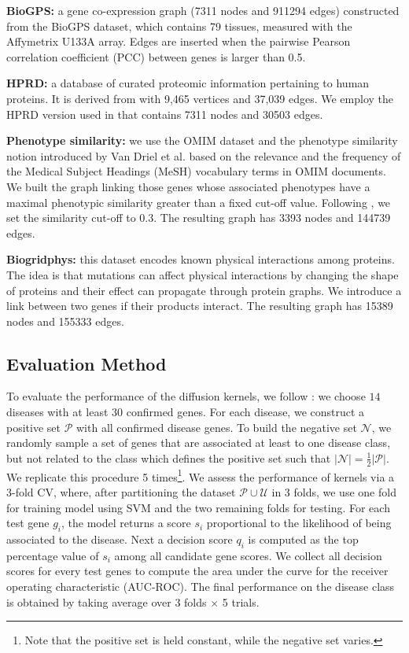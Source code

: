 \textbf{BioGPS:} a gene co-expression graph (7311 nodes and 911294 edges) 
constructed from the BioGPS dataset, which contains 79 tissues, measured with
the Affymetrix U133A array. Edges are inserted when the pairwise Pearson
correlation coefficient (PCC) between genes is larger than 0.5.

\textbf{HPRD:} a database of curated proteomic information pertaining to
human proteins. It is derived from \cite{jour6} with 9,465 vertices and 37,039
edges. We employ the HPRD version used in \cite{jour5} that contains 7311 nodes and 30503 edges. 

\textbf{Phenotype similarity:} we use the OMIM \cite{jour4} dataset and the
phenotype similarity notion introduced by Van Driel et al. \cite{jour7} based on the relevance and the frequency of the Medical Subject Headings (MeSH) vocabulary terms in OMIM documents. We built the graph linking those
genes whose associated phenotypes have a maximal phenotypic similarity greater
than a fixed cut-off value. Following \cite{jour7}, we set the
similarity cut-off to $0.3$. The resulting graph has 3393 nodes and 144739 edges.

\textbf{Biogridphys:} this dataset encodes known physical interactions
among proteins. The idea is that mutations can affect physical interactions by
changing the shape of proteins and their effect can propagate through protein
graphs. We introduce a link between two genes if their products interact. The resulting graph has 15389 nodes and 155333 edges.

\subsection{Evaluation Method}

To evaluate the performance of the diffusion kernels, we follow \cite{proceeding3}: we choose $14$ diseases with at least $30$ confirmed genes. For each disease, we construct a positive set $\mathcal{P}$ with all
confirmed disease genes. To build the negative set $\mathcal{N}$, we randomly sample a set of genes that are associated at least to one disease class, but not related to the class which defines the positive set such that $\vert \mathcal{N} \vert = \frac{1}{2} \vert \mathcal{P} \vert$. We replicate this procedure 5 times\footnote{Note that the positive set is held constant, while the negative set varies.}. We assess the performance of kernels via a 3-fold CV, where, after partitioning  the dataset $\mathcal{P} \cup \mathcal{U}$ in 3 folds, we use one fold for training model using SVM and the two remaining folds for testing. For each test gene $g_i$, the model returns a score $s_i$ proportional to the likelihood of being associated to the disease. Next a decision score $q_i$ is computed as the top percentage value of $s_i$ among all candidate gene scores.
We collect all decision scores for every test genes to compute the area under the curve for the receiver operating characteristic (AUC-ROC).  The final performance on the disease class is obtained by taking average over 3 folds $\times$ 5 trials.


